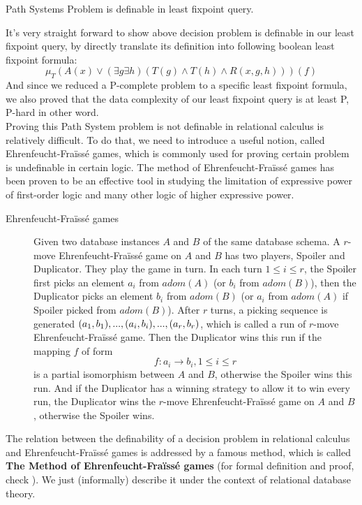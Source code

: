 \begin{claim}
Path Systems Problem is definable in least fixpoint query.
\end{claim}

It's very straight forward to show above decision problem is definable in our least fixpoint query, by directly translate its definition into following boolean least fixpoint formula:
$$ \mu_T(A(x)\lor (\exists g \exists h)(T(g)\land T(h) \land R(x, g, h)))(f) $$
And since we reduced a P-complete problem to a specific least fixpoint formula, we also proved that the data complexity of our least fixpoint query is at least P, P-hard in other word.\\

Proving this Path System problem is not definable in relational calculus is relatively difficult. To do that, we need to introduce a useful notion, called Ehrenfeucht-Fra\"iss\'e games, which is commonly used for proving certain problem is undefinable in certain logic. The method of Ehrenfeucht-Fra\"iss\'e games has been proven to be an effective tool in studying the limitation of expressive power of first-order logic and many other logic of higher expressive power.

\begin{description}
\item[Ehrenfeucht-Fra\"iss\'e games]
Given two database instances $A$ and $B$ of the same database schema. A $r$-move Ehrenfeucht-Fra\"iss\'e game on $A$ and $B$ has two players, Spoiler and Duplicator. They play the game in turn. In each turn $1\leq i \leq r$, the Spoiler first picks an element $a_i$ from $adom(A)$ (or $b_i$ from $adom(B)$), then the Duplicator picks an element $b_i$ from $adom(B)$ (or $a_i$ from $adom(A)$ if Spoiler picked from $adom(B)$). After $r$ turns, a picking sequence is generated $(a_1, b_1),...,(a_i,b_i),...,\\(a_r, b_r)$, which is called a run of $r$-move Ehrenfeucht-Fra\"iss\'e game. Then the Duplicator wins this run if the mapping $f$ of form
$$ f: a_i\rightarrow b_i, 1\leq i \leq r$$
is a partial isomorphism between $A$ and $B$, otherwise the Spoiler wins this run. And if the Duplicator has a winning strategy to allow it to win every run, the Duplicator wins the $r$-move Ehrenfeucht-Fra\"iss\'e game on $A$ and $B$, otherwise the Spoiler wins.
\end{description}

The relation between the definability of a decision problem in relational calculus and Ehrenfeucht-Fra\"iss\'e games is addressed by a famous method, which is called \textbf{The Method of Ehrenfeucht-Fra\"iss\'e games} (for formal definition and proof, check \cite{kolaitis1}). We just (informally) describe it under the context of relational database theory.

